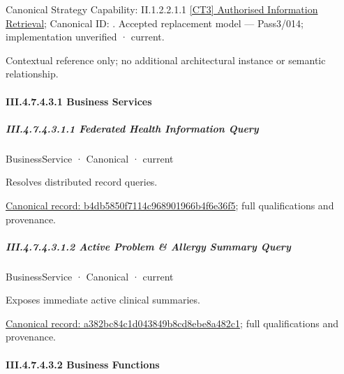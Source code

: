 {\small Canonical Strategy Capability: II.1.2.2.1.1 \hyperref[element:2c8a8c2de8a947478e06212a90ff066f]{[CT3] Authorised Information Retrieval}; Canonical ID: \texttt{}. Accepted replacement model — Pass3/014; implementation unverified · current.}\par
Contextual reference only; no additional architectural instance or semantic relationship.\par
\paragraph*{III.4.7.4.3.1 Business Services}
\label{navigation:III.4.7.4.3.1}

\subparagraph*{III.4.7.4.3.1.1 Federated Health Information Query}
\label{navigation:III.4.7.4.3.1.1}

\label{element:b4db5850f7114c968901966b4f6e36f5}
{\small BusinessService · Canonical · current}\par

Resolves distributed record queries.


{\footnotesize \href{../../../../../../../continuum/business/business-service/b4db5850f7114c968901966b4f6e36f5.md}{Canonical record: b4db5850f7114c968901966b4f6e36f5}; full qualifications and provenance.}\par
\subparagraph*{III.4.7.4.3.1.2 Active Problem \& Allergy Summary Query}
\label{navigation:III.4.7.4.3.1.2}

\label{element:a382bc84c1d043849b8cd8ebe8a482c1}
{\small BusinessService · Canonical · current}\par

Exposes immediate active clinical summaries.


{\footnotesize \href{../../../../../../../continuum/business/business-service/a382bc84c1d043849b8cd8ebe8a482c1.md}{Canonical record: a382bc84c1d043849b8cd8ebe8a482c1}; full qualifications and provenance.}\par
\paragraph*{III.4.7.4.3.2 Business Functions}
\label{navigation:III.4.7.4.3.2}

